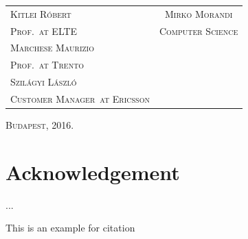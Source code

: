 \documentclass[a4paper,11pt]{report} %
\theoremstyle{change}
\theoremstyle{theoremstyle}
\def\myauthor{Mirko Morandi} %
\def\myacdsup{Kitlei Róbert} %
\def\myacdsuptit{Prof.}%
\def\myacdsupen{Marchese Maurizio} %
\def\myacdsupentit{Prof.}%
\def\myentryuni{Trento}%
\def\myindsup{Szilágyi László}%
\def\myindsuptit{Customer Manager}%
\def\myindcom{Ericsson}%
\def\currentyear{2016.}%
\begin{document}
\begin{titlepage}
\begin{tabular}{p{9cm}c}
{\fontsize{14}{10} \scshape \myacdsup} & {\fontsize{14}{10} \scshape \myauthor}\\

{\fontsize{12}{20} \scshape  \myacdsuptit \ at ELTE}\quad & {\fontsize{12}{20} \scshape Computer Science}\\

{\fontsize{14}{20} \scshape \myacdsupen}&\\

{\fontsize{12}{20} \scshape \myacdsupentit \ at \myentryuni}&\\

{\fontsize{14}{20} \scshape \myindsup}&\\

{\fontsize{12}{20} \scshape \myindsuptit \ at \myindcom}&\\
\end{tabular}

\vspace{3cm}
\begin{center}
{\large \scshape Budapest, \currentyear \\}
\end{center}
\end{titlepage}





\chapter*{Acknowledgement}
...

\tableofcontents













This is an example for citation \cite{abramowitz+stegun}



\end{document}
